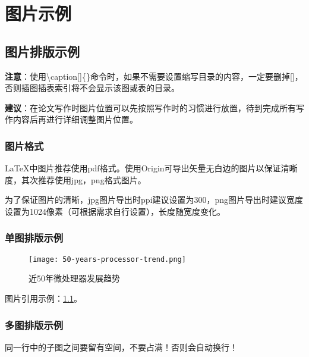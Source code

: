 \chapter{图片示例}\label{ch:2}

\section{图片排版示例}
\textbf{注意}：使用\textbackslash caption[]\{\}命令时，如果不需要设置缩写目录的内容，一定要删掉[]，否则插图插表索引将不会显示该图或表的目录。

\textbf{建议}：在论文写作时图片位置可以先按照写作时的习惯进行放置，待到完成所有写作内容后再进行详细调整图片位置。

\subsection{图片格式}

\LaTeX 中图片推荐使用pdf格式。使用Origin可导出矢量无白边的图片以保证清晰度，其次推荐使用jpg，png格式图片。

为了保证图片的清晰，jpg图片导出时ppi建议设置为300，png图片导出时建议宽度设置为1024像素（可根据需求自行设置），长度随宽度变化。

\subsection{单图排版示例}

\begin{figure}[htb]
    \texttt{[image: 50-years-processor-trend.png]}
    \caption[处理器发展]{近50年微处理器发展趋势} %
    \label{fig:processor-trend}
\end{figure}

图片引用示例：\cref{fig:processor-trend}。

\subsection{多图排版示例}
同一行中的子图之间要留有空间，不要占满！否则会自动换行！

